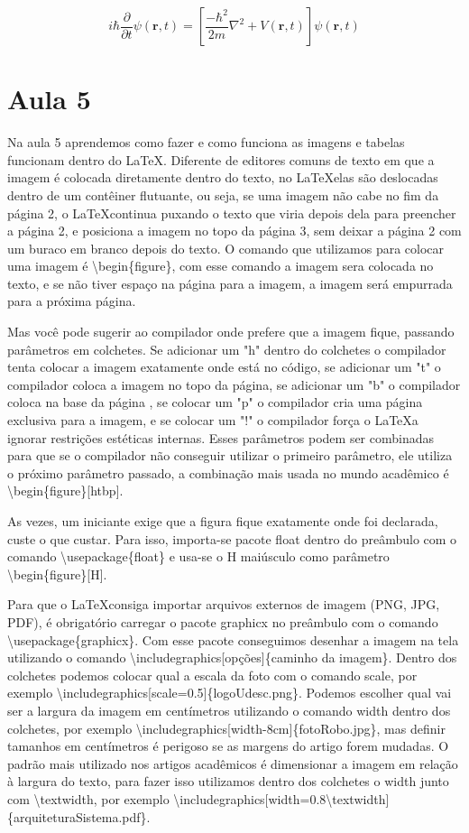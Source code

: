 \[
i\hbar \frac{\partial}{\partial t} \psi(\mathbf{r}, t) = \left [\frac{-\hbar^2}{2m}\nabla^2 + V(\mathbf{r}, t) \right ] \psi(\mathbf{r}, t)
\]

\section{Aula 5}

Na aula 5 aprendemos como fazer e como funciona as imagens e tabelas funcionam dentro do \LaTeX. Diferente de editores comuns de texto em que a imagem é colocada diretamente dentro do texto, no \LaTeX elas são deslocadas dentro de um contêiner flutuante, ou seja, se uma imagem não cabe no fim da página 2, o \LaTeX continua puxando o texto que viria depois dela para preencher a página 2, e posiciona a imagem no topo da página 3, sem deixar a página 2 com um buraco em branco depois do texto. O comando que utilizamos para colocar uma imagem é \textbackslash begin\{figure\}, com esse comando a imagem sera colocada no texto, e se não tiver espaço na página para a imagem, a imagem será empurrada para a próxima página. 

Mas você pode sugerir ao compilador onde prefere que a imagem fique, passando parâmetros em colchetes. Se adicionar um "h" dentro do colchetes o compilador tenta colocar a imagem exatamente onde está no código, se adicionar um "t" o compilador coloca a imagem no topo da página, se adicionar um "b" o compilador coloca na base da página , se colocar um "p" o compilador cria uma página exclusiva para a imagem, e se colocar um "!" o compilador força o \LaTeX a ignorar restrições estéticas internas. Esses parâmetros podem ser combinadas para que se o compilador não conseguir utilizar o primeiro parâmetro, ele utiliza o próximo parâmetro passado, a combinação mais usada no mundo acadêmico é \textbackslash begin\{figure\}[htbp].

As vezes, um iniciante exige que a figura fique exatamente onde foi declarada, custe o que custar. Para isso, importa-se pacote float dentro do preâmbulo com o comando \textbackslash usepackage\{float\} e usa-se o H maiúsculo como parâmetro \textbackslash begin\{figure\}[H].

Para que o \LaTeX consiga importar arquivos externos de imagem (PNG, JPG, PDF), é obrigatório carregar o pacote graphicx no preâmbulo com o comando \textbackslash usepackage\{graphicx\}. Com esse pacote conseguimos desenhar a imagem na tela utilizando o comando \textbackslash includegraphics[opções]\{caminho da imagem\}. Dentro dos colchetes podemos colocar qual a escala da foto com o comando scale, por exemplo \textbackslash includegraphics[scale=0.5]\{logoUdesc.png\}. Podemos escolher qual vai ser a largura da imagem em centímetros utilizando o comando width dentro dos colchetes, por exemplo \textbackslash includegraphics[width-8cm]\{fotoRobo.jpg\}, mas definir tamanhos em centímetros é perigoso se as margens do artigo forem mudadas. O padrão mais utilizado nos artigos acadêmicos é dimensionar a imagem em relação à largura do texto, para fazer isso utilizamos dentro dos colchetes o width junto com \textbackslash textwidth, por exemplo \textbackslash includegraphics[width=0.8\textbackslash textwidth]\{arquiteturaSistema.pdf\}.

